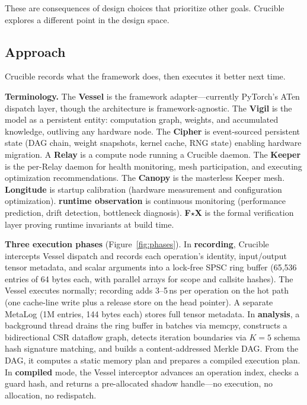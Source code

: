 These are consequences of design choices that prioritize other goals.
Crucible explores a different point in the design space.

\subsection{Approach}

Crucible records what the framework does, then executes it better next time.

\textbf{Terminology.}
The \textbf{Vessel} is the framework adapter---currently PyTorch's ATen dispatch layer, though the architecture is framework-agnostic.
The \textbf{Vigil} is the model as a persistent entity: computation graph, weights, and accumulated knowledge, outliving any hardware node.
The \textbf{Cipher} is event-sourced persistent state (DAG chain, weight snapshots, kernel cache, RNG state) enabling hardware migration.
A \textbf{Relay} is a compute node running a Crucible daemon.
The \textbf{Keeper} is the per-Relay daemon for health monitoring, mesh participation, and executing optimization recommendations.
The \textbf{Canopy} is the masterless Keeper mesh.
\textbf{Longitude} is startup calibration (hardware measurement and configuration optimization).
\textbf{runtime observation} is continuous monitoring (performance prediction, drift detection, bottleneck diagnosis).
\textbf{F$\star$X} is the formal verification layer proving runtime invariants at build time.

\textbf{Three execution phases} (Figure~\ref{fig:phases}).
In \textbf{recording}, Crucible intercepts Vessel dispatch and records each operation's identity, input/output tensor metadata, and scalar arguments into a lock-free SPSC ring buffer (65,536 entries of 64 bytes each, with parallel arrays for scope and callsite hashes).
The Vessel executes normally; recording adds 3--5\,ns per operation on the hot path (one cache-line write plus a release store on the head pointer).
A separate MetaLog (1M entries, 144 bytes each) stores full tensor metadata.
In \textbf{analysis}, a background thread drains the ring buffer in batches via memcpy, constructs a bidirectional CSR dataflow graph, detects iteration boundaries via $K{=}5$ schema hash signature matching, and builds a content-addressed Merkle DAG.
From the DAG, it computes a static memory plan and prepares a compiled execution plan.
In \textbf{compiled} mode, the Vessel interceptor advances an operation index, checks a guard hash, and returns a pre-allocated shadow handle---no execution, no allocation, no redispatch.

